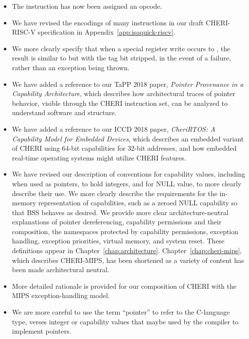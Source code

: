 \begin{itemize}
\item The instruction  has now been assigned an opcode.

\item We have revised the encodings of many instructions in our draft
  CHERI-RISC-V specification in Appendix~\ref{app:isaquick-riscv}.

\item We more clearly specify that when a special register write occurs to
  \EPC{}, the result is similar to  but with the tag
  bit stripped, in the event of a failure, rather than an exception being
  thrown.

\item We have added a reference to our TaPP 2018 paper, \textit{Pointer
  Provenance in a Capability Architecture}, which describes how architectural
  traces of pointer behavior, visible through the CHERI instruction set, can
  be analyzed to understand software and structure.

\item We have added a reference to our ICCD 2018 paper, \textit{CheriRTOS:
  A Capability Model for Embedded Devices}, which describes an embedded
  variant of CHERI using 64-bit capabilities for 32-bit addresses, and how
  embedded real-time operating systems might utilize CHERI features.

\item We have revised our description of conventions for capability values,
  including when used as pointers, to hold integers, and for NULL value, to
  more clearly describe their use.
  We more clearly describe the requirements for the in-memory
  representation of capabilities, such as a zeroed NULL capability so that
  BSS behaves as desired.
  We provide more clear architecture-neutral explanations of pointer
  dereferencing, capability
  permissions and their composition, the namespaces protected by capability
  permissions, exception handling, exception priorities, virtual memory, and
  system reset.
  These definitions appear in Chapter~\ref{chap:architecture}.
  Chapter~\ref{chap:cheri-mips}, which describes CHERI-MIPS, has been
  shortened as a variety of content has been made architectural neutral.

\item More detailed rationale is provided for our composition of CHERI with
  the MIPS exception-handling model.

\item We are more careful to use the term ``pointer'' to refer to the
  C-language type, verses integer or capability values that maybe used by the
  compiler to implement pointers.


\end{itemize}
